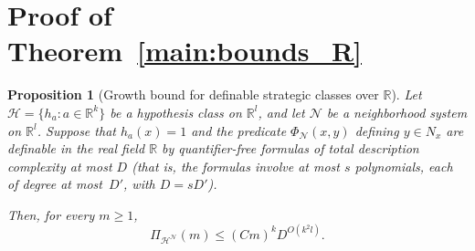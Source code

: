 \documentclass[11pt]{article}
\theoremstyle{plain}
\newtheorem{proposition}[theorem]{Proposition}
\theoremstyle{definition}
\theoremstyle{remark}
\newcommand{\R}{\mathbb{R}}
\begin{document}





\section{Proof of Theorem~\ref{main:bounds_R}}
\label{app:sec:proof-R-bounds}

\begin{proposition}[Growth bound for definable strategic classes over $\R$]
\label{prop:growth-R}
Let $\mathcal H=\{h_a:a\in\R^k\}$ be a hypothesis class on $\R^l$, and let
$\mathcal N$ be a neighborhood system on $\R^l$. Suppose that
\(h_a(x)=1\) and the predicate \(\Phi_{\mathcal N}(x,y)\) defining
\(y\in N_x\) are definable in the real field $\R$ by quantifier-free
formulas of \emph{total description complexity} at most $D$
(that is, the formulas involve at most $s$ polynomials, each of degree at
most~$D'$, with $D=sD'$).

Then, for every $m\ge 1$,
\[
\Pi_{\mathcal H^{\mathcal N}}(m)
\le
(Cm)^k D^{O(k^2l)}.
\]
\end{proposition}
\end{document}
